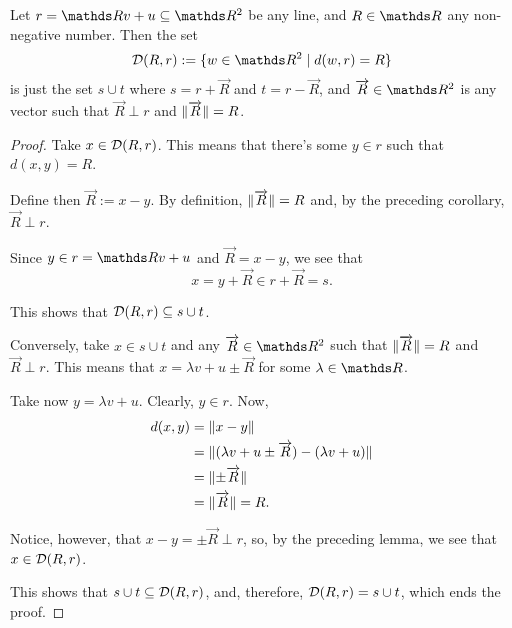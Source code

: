 \begin{lemma}
	Let $r=\R v+u\subseteq \R^2$ be any line, and $R\in \R$ any non-negative number. Then the set 
	\[\mc D(R,r):=\{w\in \R^2\mid d(w,r)=R\}\]is just the set $s\cup t$ where $s=r+\overrightarrow{R}$ and $t=r-\overrightarrow{R}$, and $\overrightarrow{R}\in \R^2$ is any vector such that $\overrightarrow{R}\perp r$ and $\lVert\overrightarrow{R}\rVert=R$.
\end{lemma}
\begin{proof}
	Take $x\in \mathcal D(R,r)$. This means that there's some $y\in r$ such that $d(x,y)=R$.
	
	Define then $\overrightarrow{R}:=x-y$. By definition, $\lVert\overrightarrow{R}\rVert=R$ and, by the preceding corollary, $\overrightarrow{R}\perp r$.
	
	Since $y\in r=\R v+u$ and $\overrightarrow{R}=x-y$, we see that $$x=y+\overrightarrow{R}\in r+\overrightarrow{R}=s.$$
	
	This shows that $\mathcal D(R,r)\subseteq s\cup t$.
	
	\bigskip
	Conversely, take $x\in s\cup t$ and any $\overrightarrow{R}\in\R^2$ such that $\lVert\overrightarrow{R}\rVert=R$ and $\overrightarrow{R}\perp r$. This means that $x=\lambda v+u\pm\overrightarrow{R}$ for some $\lambda\in \R$.
	
	Take now $y=\lambda v+u$. Clearly, $y\in r$. Now,
	\begin{align*}
		d(x,y)&=\lVert x-y\rVert\\
		&=\lVert(\lambda v+u\pm\overrightarrow{R})-(\lambda v+u)\rVert\\
		&=\lVert\pm\overrightarrow{R}\rVert\\
		&=\lVert\overrightarrow{R}\rVert=R.
	\end{align*}
	
	Notice, however, that $x-y=\pm\overrightarrow{R}\perp r$, so, by the preceding lemma, we see that $x\in \mathcal D(R,r)$.
	
	This shows that $s\cup t\subseteq\mathcal D(R,r)$, and, therefore, $\mathcal D(R,r)=s\cup t$, which ends the proof.
\end{proof}

